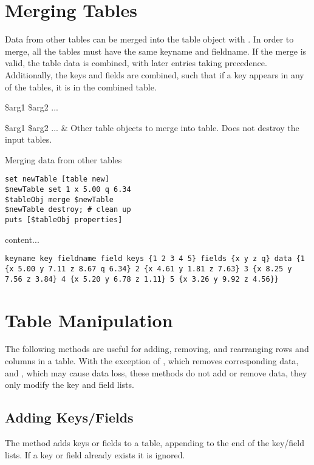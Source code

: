 \section{Merging Tables}
Data from other tables can be merged into the table object with . 
In order to merge, all the tables must have the same keyname and fieldname. 
If the merge is valid, the table data is combined, with later entries taking precedence. 
Additionally, the keys and fields are combined, such that if a key appears in any of the tables, it is in the combined table.

\begin{syntax}
 \$arg1 \$arg2 ...
\end{syntax}
\begin{args}
\$arg1 \$arg2 ... & Other table objects to merge into table. Does not destroy the input tables. 
\end{args}

\begin{example}{Merging data from other tables}
\begin{lstlisting}
set newTable [table new]
$newTable set 1 x 5.00 q 6.34
$tableObj merge $newTable
$newTable destroy; # clean up
puts [$tableObj properties]
\end{lstlisting}
content...
\tcblower
\begin{lstlisting}
keyname key fieldname field keys {1 2 3 4 5} fields {x y z q} data {1 {x 5.00 y 7.11 z 8.67 q 6.34} 2 {x 4.61 y 1.81 z 7.63} 3 {x 8.25 y 7.56 z 3.84} 4 {x 5.20 y 6.78 z 1.11} 5 {x 3.26 y 9.92 z 4.56}}
\end{lstlisting}
\end{example}
\clearpage
\section{Table Manipulation}
The following methods are useful for adding, removing, and rearranging rows and columns in a table.
With the exception of , which removes corresponding data, and , which may cause data loss, these methods do not add or remove data, they only modify the key and field lists. 

\subsection{Adding Keys/Fields}
The method  adds keys or fields to a table, appending to the end of the key/field lists. If a key or field already exists it is ignored.

